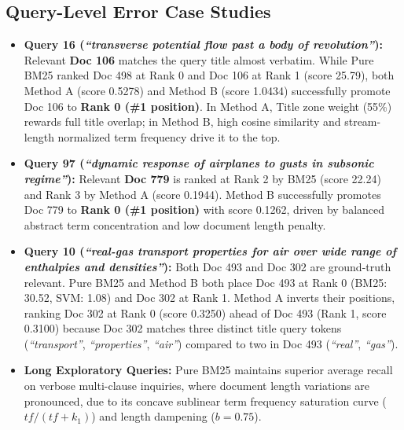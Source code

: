 \documentclass[11pt,a4paper]{article}
\begin{document}
\subsection{Query-Level Error Case Studies}
\begin{itemize}[leftmargin=*]
    \item \textbf{Query 16 (\textit{``transverse potential flow past a body of revolution''}):} Relevant \textbf{Doc 106} matches the query title almost verbatim. While Pure BM25 ranked Doc 498 at Rank 0 and Doc 106 at Rank 1 (score 25.79), both Method A (score 0.5278) and Method B (score 1.0434) successfully promote Doc 106 to \textbf{Rank 0 (\#1 position)}. In Method A, Title zone weight (55\%) rewards full title overlap; in Method B, high cosine similarity and stream-length normalized term frequency drive it to the top.
    \item \textbf{Query 97 (\textit{``dynamic response of airplanes to gusts in subsonic regime''}):} Relevant \textbf{Doc 779} is ranked at Rank 2 by BM25 (score 22.24) and Rank 3 by Method A (score 0.1944). Method B successfully promotes Doc 779 to \textbf{Rank 0 (\#1 position)} with score 0.1262, driven by balanced abstract term concentration and low document length penalty.
    \item \textbf{Query 10 (\textit{``real-gas transport properties for air over wide range of enthalpies and densities''}):} Both Doc 493 and Doc 302 are ground-truth relevant. Pure BM25 and Method B both place Doc 493 at Rank 0 (BM25: 30.52, SVM: 1.08) and Doc 302 at Rank 1. Method A inverts their positions, ranking Doc 302 at Rank 0 (score 0.3250) ahead of Doc 493 (Rank 1, score 0.3100) because Doc 302 matches three distinct title query tokens (\textit{``transport''}, \textit{``properties''}, \textit{``air''}) compared to two in Doc 493 (\textit{``real''}, \textit{``gas''}).
    \item \textbf{Long Exploratory Queries:} Pure BM25 maintains superior average recall on verbose multi-clause inquiries, where document length variations are pronounced, due to its concave sublinear term frequency saturation curve ($tf / (tf + k_1)$) and length dampening ($b = 0.75$).
\end{itemize}

\end{document}
